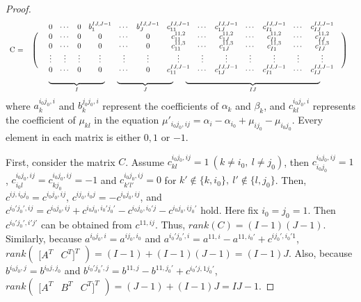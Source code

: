 \documentclass[12pt]{article}
\begin{document}
\begin{proof}
\begin{equation*}
\begin{array}{crcccccccccccccl}
            && 0 & \cdots & 0 & b^{IJ,J-1}_{1} & \cdots & b^{IJ,J-1}_{J} &c^{IJ,J-1}_{11} & \cdots & c^{IJ,J-1}_{1J}  & \cdots & c^{IJ,J-1}_{I1} & \cdots & c^{IJ,J-1}_{IJ} &\\
            \multirow{4}{*}{C\ =}&\ldelim({4}{14pt}[] & 0 & \cdots & 0 & 0 & \cdots & 0 & c^{11,2}_{11} & \cdots & c^{11,2}_{1J}  & \cdots & c^{11,2}_{I1} & \cdots & c^{11,2}_{IJ} & \rdelim){4}{14pt}[] \\
            && 0 & \cdots & 0 & 0 & \cdots & 0 &c^{11,3}_{11} & \cdots & c^{11,3}_{1J}  & \cdots & c^{11,3}_{I1} & \cdots & c^{11,3}_{IJ} & \\
            && \vdots & \vdots & \vdots & \vdots & \vdots & \vdots & \vdots & \vdots & \vdots &\vdots & \vdots & \vdots & \vdots &\\
            && 0 & \cdots & 0 & 0 & \cdots & 0 &c^{IJ,J-1}_{11} & \cdots & c^{IJ,J-1}_{1J}  & \cdots & c^{IJ,J-1}_{I1} & \cdots & c^{IJ,J-1}_{IJ} &\\
             && \multicolumn{13}{l}{\underbrace{\hspace{7.5em}}_{I}\hspace{1.5em}\underbrace{\hspace{7.5em}}_{J}\hspace{1.5em}\underbrace{\hspace{18em}}_{IJ}} & \\
        \end{array}
    \end{equation*}
    \arraycolsep=5pt
    where $a^{i_0j_0,i}_{k}$ and $b^{j_0j_0,i}_{k}$ represent the coefficients of $\alpha_k$ and $\beta_k$, and $c^{i_0j_0,i}_{kl}$ represents the coefficient of $\mu_{kl}$ in the equation $\mu'_{i_0j_0,ij}=\alpha_i-\alpha_{i_0}+\mu_{ij_0}-\mu_{i_0j_0}$. 
    Every element in each matrix is either $0, 1$ or $-1$.
    
    First, consider the matrix $C$. 
    Assume $c^{i_0j_0,ij}_{kl}=1\ (k\neq i_0,\ l\neq j_0)$, then $c^{i_0j_0,ij}_{i_0j_0}=1$, $c^{i_0j_0,ij}_{i_0l}=c^{i_0j_0,ij}_{kj_0}=-1$ and $c^{i_0j_0,ij}_{k'l'}=0$ for $k'\notin \{k,i_0\},\ l'\notin \{l,j_0\}$. 
    Then, $c^{ij,i_0j_0}=c^{i_0j_0,ij}$, $c^{ij_0,i_0j}=-c^{i_0j_0,ij}$, and $c^{i_0'j_0',ij}=c^{i_0j_0,ij}+c^{i_0j_0,i_0'j_0'}-c^{i_0j_0,i_0'j}-c^{i_0j_0,ij_0'}$ hold. 
    Here fix $i_0=j_0=1$. 
    Then $c^{i_0'j_0',i'j'}$ can be obtained from $c^{11,ij}$. 
    Thus, $rank(C)=(I-1)(J-1)$.
    Similarly, because $a^{i_0j_0,i}=a^{ij_0,i_0}$ and $a^{i_0'j_0',i}=a^{11,i}-a^{11,i_0'}+c^{ij_0',i_0'1}$, $rank
    \begin{pmatrix}
        [A^T& C^T]^T
    \end{pmatrix} = 
    (I-1)+(I-1)(J-1)=(I-1)J$.
    Also, because $b^{i_0j_0,j}=b^{i_0j,j_0}$ and $b^{i_0'j_0',j}=b^{11,j}-b^{11,j_0'}+c^{i_0'j,1j_0'}$, $rank\begin{pmatrix}
        [A^T & B^T & C^T]^T
    \end{pmatrix}= (J-1)+(I-1)J=IJ-1$.
    

\end{proof}
\end{document}
